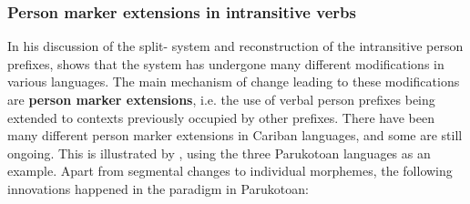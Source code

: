%

\subsubsection{Person marker extensions in intransitive verbs}
\label{sec:extensions_intro}
In his discussion of the \PC split- system and reconstruction of the intransitive person prefixes, \textcite[88--96]{gildea1998} shows that the system has undergone many different modifications in various languages.
The main mechanism of change leading to these modifications are \textbf{person marker extensions}, i.e. the use of verbal person prefixes being extended to contexts previously occupied by other prefixes.
There have been many different person marker extensions in Cariban languages, and some are still ongoing.
This is illustrated by \textcite{gildea1998}, using the three Parukotoan languages as an example.
Apart from segmental changes to individual morphemes, the following innovations happened in the \setone paradigm in Parukotoan:

